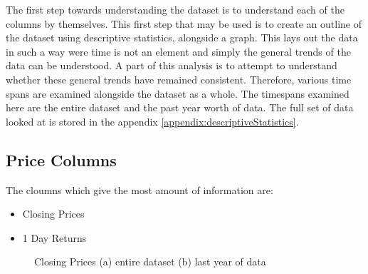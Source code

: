 The first step towards understanding the dataset is to understand each of the columns by themselves. This first step that may be used is to create an outline of the dataset using descriptive statistics, alongside a graph. This lays out the data in such a way were time is not an element and simply the general trends of the data can be understood. A part of this analysis is to attempt to understand whether these general trends have remained consistent. Therefore, various time spans are examined alongside the dataset as a whole. The timespans examined here are the entire dataset and the past year worth of data. The full set of data looked at is stored in the appendix \ref{appendix:descriptiveStatistics}.

\subsection{Price Columns}

The cloumns which give the most amount of information are:
\begin{itemize}
    \item Closing Prices
    \item 1 Day Returns
\end{itemize}

\begin{figure}[h!]
    \centering
    \caption{Closing Prices (a) entire dataset (b) last year of data}
    \label{fig:closeDesc}
\end{figure}

